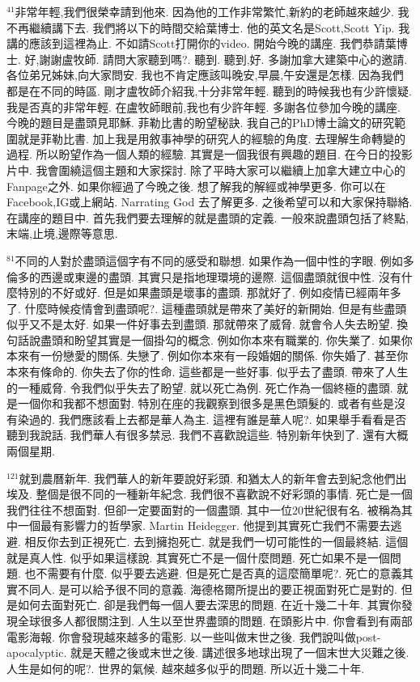 \documentclass{book}
\begin{document}
$^{41}$非常年輕,我們很榮幸請到他來.
因為他的工作非常繁忙,新約的老師越來越少.
我不再繼續講下去.
我們將以下的時間交給葉博士.
他的英文名是Scott,Scott Yip.
我講的應該到這裡為止.
不如請Scott打開你的video.
開始今晚的講座.
我們恭請葉博士.
好,謝謝盧牧師.
請問大家聽到嗎?.
聽到.
聽到,好.
多謝加拿大建築中心的邀請.
各位弟兄姊妹,向大家問安.
我也不肯定應該叫晚安,早晨,午安還是怎樣.
因為我們都是在不同的時區.
剛才盧牧師介紹我,十分非常年輕.
聽到的時候我也有少許懷疑.
我是否真的非常年輕.
在盧牧師眼前,我也有少許年輕.
多謝各位參加今晚的講座.
今晚的題目是盡頭見耶穌.
菲勒比書的盼望秘訣.
我自己的PhD博士論文的研究範圍就是菲勒比書.
加上我是用敘事神學的研究人的經驗的角度.
去理解生命轉變的過程.
所以盼望作為一個人類的經驗.
其實是一個我很有興趣的題目.
在今日的投影片中.
我會圍繞這個主題和大家探討.
除了平時大家可以繼續上加拿大建立中心的Fanpage之外.
如果你經過了今晚之後.
想了解我的解經或神學更多.
你可以在Facebook,IG或上網站.
Narrating God 去了解更多.
之後希望可以和大家保持聯絡.
在講座的題目中.
首先我們要去理解的就是盡頭的定義.
一般來說盡頭包括了終點,末端,止境,邊際等意思.

$^{81}$不同的人對於盡頭這個字有不同的感受和聯想.
如果作為一個中性的字眼.
例如多倫多的西邊或東邊的盡頭.
其實只是指地理環境的邊際.
這個盡頭就很中性.
沒有什麼特別的不好或好.
但是如果盡頭是壞事的盡頭.
那就好了.
例如疫情已經兩年多了.
什麼時候疫情會到盡頭呢?.
這種盡頭就是帶來了美好的新開始.
但是有些盡頭似乎又不是太好.
如果一件好事去到盡頭.
那就帶來了威脅.
就會令人失去盼望.
換句話說盡頭和盼望其實是一個掛勾的概念.
例如你本來有職業的.
你失業了.
如果你本來有一份戀愛的關係.
失戀了.
例如你本來有一段婚姻的關係.
你失婚了.
甚至你本來有條命的.
你失去了你的性命.
這些都是一些好事.
似乎去了盡頭.
帶來了人生的一種威脅.
令我們似乎失去了盼望.
就以死亡為例.
死亡作為一個終極的盡頭.
就是一個你和我都不想面對.
特別在座的我觀察到很多是黑色頭髮的.
或者有些是沒有染過的.
我們應該看上去都是華人為主.
這裡有誰是華人呢?.
如果舉手看看是否聽到我說話.
我們華人有很多禁忌.
我們不喜歡說這些.
特別新年快到了.
還有大概兩個星期.

$^{121}$就到農曆新年.
我們華人的新年要說好彩頭.
和猶太人的新年會去到紀念他們出埃及.
整個是很不同的一種新年紀念.
我們很不喜歡說不好彩頭的事情.
死亡是一個我們往往不想面對.
但卻一定要面對的一個盡頭.
其中一位20世紀很有名.
被稱為其中一個最有影響力的哲學家.
Martin Heidegger.
他提到其實死亡我們不需要去逃避.
相反你去到正視死亡.
去到擁抱死亡.
就是我們一切可能性的一個最終結.
這個就是真人性.
似乎如果這樣說.
其實死亡不是一個什麼問題.
死亡如果不是一個問題.
也不需要有什麼.
似乎要去逃避.
但是死亡是否真的這麼簡單呢?.
死亡的意義其實不同人.
是可以給予很不同的意義.
海德格爾所提出的要正視面對死亡是對的.
但是如何去面對死亡.
卻是我們每一個人要去深思的問題.
在近十幾二十年.
其實你發現全球很多人都很關注到.
人生以至世界盡頭的問題.
在頭影片中.
你會看到有兩部電影海報.
你會發現越來越多的電影.
以一些叫做末世之後.
我們說叫做post-apocalyptic.
就是天體之後或末世之後.
講述很多地球出現了一個末世大災難之後.
人生是如何的呢?.
世界的氣候.
越來越多似乎的問題.
所以近十幾二十年.
\end{document}
